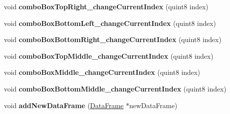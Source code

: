 \begin{DoxyCompactItemize}
void {\bfseries combo\+Box\+Top\+Right\+\_\+change\+Current\+Index} (quint8 index)
\item 
\mbox{\label{class_trigger_window_a209f597f275c8c85f1dcb5b63f2090d4}} 
void {\bfseries combo\+Box\+Bottom\+Left\+\_\+change\+Current\+Index} (quint8 index)
\item 
\mbox{\label{class_trigger_window_af70fb35e39b0b4ec5b09621b86be247f}} 
void {\bfseries combo\+Box\+Bottom\+Right\+\_\+change\+Current\+Index} (quint8 index)
\item 
\mbox{\label{class_trigger_window_a8aa1fbe57eb70036bd22f853509d4dc2}} 
void {\bfseries combo\+Box\+Top\+Middle\+\_\+change\+Current\+Index} (quint8 index)
\item 
\mbox{\label{class_trigger_window_ad3ad162c19aa9d11a4c2a55dbff7250b}} 
void {\bfseries combo\+Box\+Middle\+\_\+change\+Current\+Index} (quint8 index)
\item 
\mbox{\label{class_trigger_window_a6ef9b1287eae10893f27f7b1209f6906}} 
void {\bfseries combo\+Box\+Bottom\+Middle\+\_\+change\+Current\+Index} (quint8 index)
\item 
\mbox{\label{class_trigger_window_a3310fcabf723c5feb86c52319f3aa81c}} 
void {\bfseries add\+New\+Data\+Frame} (\hyperlink{class_data_frame}{Data\+Frame} $\ast$new\+Data\+Frame)
\end{DoxyCompactItemize}
